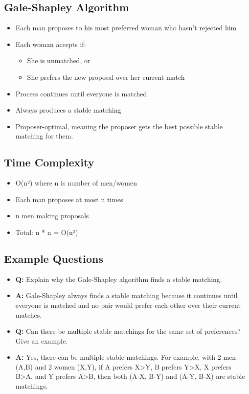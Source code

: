 \documentclass[11pt,a4paper]{article}
\begin{document}
\begin{multicols}{2}
\subsection{Gale-Shapley Algorithm}
\begin{itemize}
    \item Each man proposes to his most preferred woman who hasn't rejected him
    \item Each woman accepts if:
        \begin{itemize}
            \item She is unmatched, or
            \item She prefers the new proposal over her current match
        \end{itemize}
    \item Process continues until everyone is matched
    \item Always produces a stable matching
    \item Proposer-optimal, meaning the proposer gets the best possible stable matching for them.
\end{itemize}

\subsection{Time Complexity}
\begin{itemize}
    \item O(n²) where n is number of men/women
    \item Each man proposes at most n times
    \item n men making proposals
    \item Total: n * n = O(n²)
\end{itemize}

\subsection{Example Questions}
\begin{itemize}
    \item \textbf{Q:} Explain why the Gale-Shapley algorithm finds a stable matching.
    \item \textbf{A:} Gale-Shapley always finds a stable matching because it continues until everyone is matched and no pair would prefer each other over their current matches.

    \item \textbf{Q:} Can there be multiple stable matchings for the same set of preferences? Give an example.
    \item \textbf{A:} Yes, there can be multiple stable matchings. For example, with 2 men (A,B) and 2 women (X,Y), if A prefers X>Y, B prefers Y>X, X prefers B>A, and Y prefers A>B, then both (A-X, B-Y) and (A-Y, B-X) are stable matchings.


\end{itemize}
\end{multicols}
\end{document}

